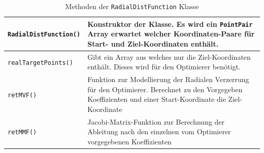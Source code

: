 \begin{table}[H]
	\begin{tabular}{|p{} | p{}|} 
		\hline
		\texttt{RadialDistFunction()} & Konstruktor der Klasse. Es wird ein \texttt{PointPair} Array erwartet welcher Koordinaten-Paare für Start- und Ziel-Koordinaten enthält.\\ \hline
		\texttt{realTargetPoints()} & Gibt ein Array aus welches nur die Ziel-Koordinaten enthält. Dieses wird für den Optimierer benötigt.\\ \hline
		\texttt{retMVF()} & Funktion zur Modellierung der Radialen Verzerrung für den Optimierer. Berechnet zu den Vorgegeben Koeffizienten und einer Start-Koordinate die Ziel-Koordinate\\ \hline
		\texttt{retMMF()} & Jacobi-Matrix-Funktion zur Berechnung der Ableitung nach den einzelnen vom Optimierer vorgegebenen Koeffizienten \\ 
		\hline
	\end{tabular}
	\caption{Methoden der \texttt{RadialDistFunction} Klasse}
\end{table}

